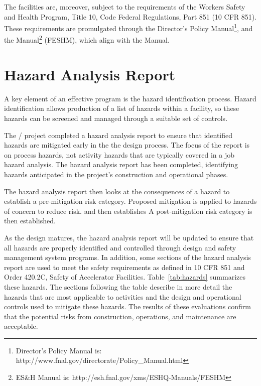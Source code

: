 The \fnal facilities are, moreover, subject to the requirements of the
 Workers Safety and Health Program, Title 10, Code Federal
Regulations, Part 851 (10 CFR 851). These requirements are
promulgated through the \fnal Director's Policy Manual\footnote{\fnal
  Director's Policy Manual is:
  http://www.fnal.gov/directorate/Policy\_Manual.html}, and the \fnal
{} Manual\footnote{\fnal ES\&H Manual is:
  http://esh.fnal.gov/xms/ESHQ-Manuals/FESHM} (FESHM), which align with
the \surf {} Manual.

\section{Hazard Analysis Report}

A key element of an effective  program is the hazard
identification process. Hazard identification allows production of a
list of hazards within a facility, so these hazards can be screened
and managed through a suitable set of controls.

The / project completed a hazard analysis
report to ensure that identified hazards are mitigated early in the
the design process.  The focus of the report is on process hazards,
not activity hazards that are typically covered in a job hazard
analysis.  The hazard analysis report has been completed, identifying
hazards anticipated in the project's construction and operational
phases.

The hazard analysis report then looks at the consequences of a hazard
to establish a pre-mitigation risk category. Proposed mitigation is
applied to hazards of concern to reduce risk. and then establishes A
post-mitigation risk category is then established.

As the  design matures, the hazard analysis report will be updated to ensure
that all hazards are properly identified and controlled through
design and safety management system programs.  In addition, some
sections of the hazard analysis report are used to meet the safety requirements as
defined in 10 CFR 851 and  Order 420.2C, Safety of
Accelerator Facilities.  Table~\ref{tab:hazards} summarizes these
hazards.  The sections following the table describe in more detail the hazards that
are most applicable to  activities and the
design and operational controls used to mitigate these hazards. The
results of these evaluations confirm that the potential risks from
construction, operations, and maintenance are acceptable.

